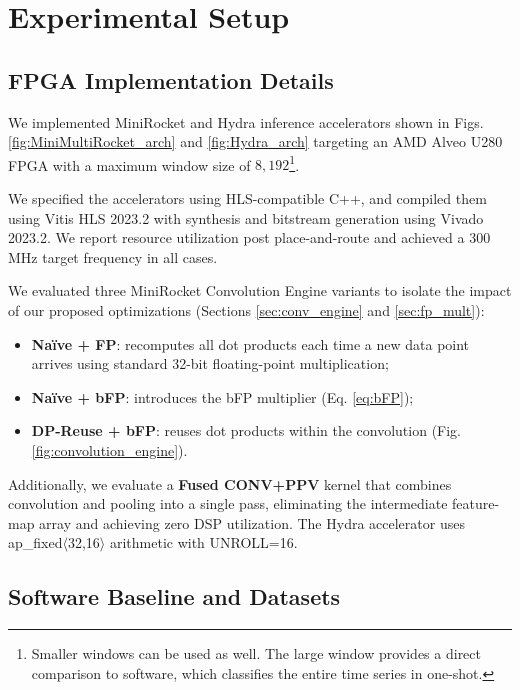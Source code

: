 

\section{Experimental Setup}
\label{sec:ExpSetup}

\subsection{FPGA Implementation Details}
\label{sec:FPGA_Implementation}

We implemented MiniRocket and Hydra inference accelerators shown in Figs. \ref{fig:MiniMultiRocket_arch} and \ref{fig:Hydra_arch} targeting an AMD Alveo U280 FPGA with a maximum window size of $8{,}192$\footnote{
Smaller windows can be used as well. The large window provides a direct comparison to software, which classifies the entire time series in one-shot.
}.

We specified the accelerators using HLS-compatible C++, and compiled them using Vitis HLS 2023.2 with synthesis and bitstream generation using Vivado 2023.2. We report resource utilization post place-and-route and achieved a 300\,MHz target frequency in all cases.

We evaluated three MiniRocket Convolution Engine variants to isolate the impact of our proposed optimizations (Sections \ref{sec:conv_engine} and \ref{sec:fp_mult}):
\begin{itemize}
\item \textbf{Na\"ive + FP}: recomputes all dot products each time a new data point arrives using standard 32-bit floating-point multiplication;
\item \textbf{Na\"ive + bFP}: introduces the bFP multiplier (Eq. \ref{eq:bFP});
\item \textbf{DP-Reuse + bFP}: reuses dot products within the convolution (Fig. \ref{fig:convolution_engine}).
\end{itemize}
Additionally, we evaluate a \textbf{Fused CONV+PPV} kernel that combines convolution and pooling into a single pass, eliminating the intermediate feature-map array and achieving zero DSP utilization.
The Hydra accelerator uses ap\_fixed$\langle$32,16$\rangle$ arithmetic with UNROLL=16.

\subsection{Software Baseline and Datasets}
\label{sec:sw_baseline_and_datasets}

